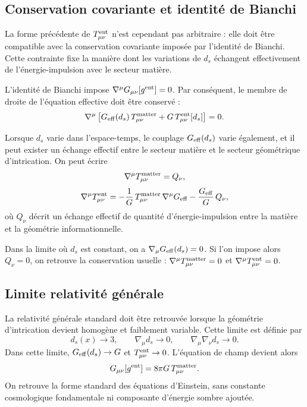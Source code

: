 \documentclass[11pt]{article}
\newcommand{\Geff}{G_{\rm eff}}
\newcommand{\ent}{\rm ent}
\begin{document}
\subsection{Conservation covariante et identit\'e de Bianchi}

La forme pr\'ec\'edente de $T_{\mu\nu}^{\ent}$ n'est cependant pas arbitraire :
elle doit \^etre compatible avec la conservation covariante impos\'ee par l'identit\'e
de Bianchi. Cette contrainte fixe la mani\`ere dont les variations de $d_s$ \'echangent
effectivement de l'\'energie-impulsion avec le secteur mati\`ere.

L'identit\'e de Bianchi impose $\nabla^\mu G_{\mu\nu}[g^{\rm ent}]=0$.
Par cons\'equent, le membre de droite de l'\'equation effective doit \^etre conserv\'e :
\[
\nabla^\mu
\left[
\Geff(d_s)\,T_{\mu\nu}^{\rm matter}
+
G\,T_{\mu\nu}^{\ent}[d_s]
\right]
=
0.
\]

Lorsque $d_s$ varie dans l'espace-temps, le couplage $\Geff(d_s)$ varie \'egalement,
et il peut exister un \'echange effectif entre le secteur mati\`ere et le secteur
g\'eom\'etrique d'intrication. On peut \'ecrire
\[
\nabla^\mu T_{\mu\nu}^{\rm matter}=Q_\nu,
\]
\[
\nabla^\mu T_{\mu\nu}^{\ent}
=
-\frac{1}{G}\,T_{\mu\nu}^{\rm matter}\,\nabla^\mu\Geff
-
\frac{\Geff}{G}\,Q_\nu,
\]
o\`u $Q_\nu$ d\'ecrit un \'echange effectif de quantit\'e d'\'energie-impulsion entre la
mati\`ere et la g\'eom\'etrie informationnelle.

Dans la limite o\`u $d_s$ est constant, on a $\nabla_\mu\Geff(d_s)=0$. Si l'on impose
alors $Q_\nu=0$, on retrouve la conservation usuelle :
$\nabla^\mu T_{\mu\nu}^{\rm matter}=0$ et $\nabla^\mu T_{\mu\nu}^{\ent}=0$.

\subsection{Limite relativit\'e g\'en\'erale}

La relativit\'e g\'en\'erale standard doit \^etre retrouv\'ee lorsque la g\'eom\'etrie
d'intrication devient homog\`ene et faiblement variable. Cette limite est d\'efinie par
\[
d_s(x)\rightarrow 3,
\qquad
\nabla_\mu d_s\rightarrow0,
\qquad
\nabla_\mu\nabla_\nu d_s\rightarrow0.
\]
Dans cette limite, $\Geff(d_s)\rightarrow G$ et $T_{\mu\nu}^{\ent}\rightarrow 0$.
L'\'equation de champ devient alors
\[
G_{\mu\nu}[g^{\rm ent}]
=
8\pi G\,T_{\mu\nu}^{\rm matter}.
\]
On retrouve la forme standard des \'equations d'Einstein, sans constante cosmologique
fondamentale ni composante d'\'energie sombre ajout\'ee.
\end{document}

